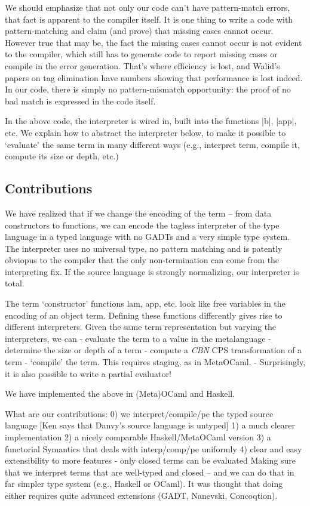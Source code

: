 \documentclass[preprint]{sigplanconf}
\begin{document}
We should emphasize that not only our code can't have pattern-match
errors, that fact is apparent to the compiler itself. It is one thing
to write a code with pattern-matching and claim (and prove) that
missing cases cannot occur. However true that may be, the fact the
missing cases cannot occur is not evident to the compiler, which still
has to generate code to report missing cases or compile in the error
generation. That's where efficiency is lost, and Walid's papers on tag
elimination have numbers showing that performance is lost indeed. 
In our code, there is simply no pattern-mismatch opportunity: the
proof of no bad match is expressed in the code itself. 


In the above code, the interpreter is wired in, built into the
functions |b|, |app|, etc. We explain how to abstract the interpreter
below, to make it possible to `evaluate' the same term in many different
ways (e.g., interpret term, compile it, compute its size or depth,
etc.)

\subsection{Contributions}

        We have realized that if we change the encoding of the term --
from data constructors to functions, we can encode the tagless
interpreter of the type language in a typed language with no GADTs and
a very simple type system. The interpreter uses no universal type, no
pattern matching and is patently obviopus to the compiler that the
only non-termination can come from the interpreting fix. If the source
language is strongly normalizing, our interpreter is total.


The term `constructor' functions lam, app, etc. look like free
variables in the encoding of an object term.  Defining these functions
differently gives rise to different interpreters.  Given the same term
representation but varying the interpreters, we can
	- evaluate the term to a value in the metalanguage
	- determine the size or depth of a term
        - compute a \emph{CBN} CPS transformation of a term
	- `compile' the term. This requires staging, as in MetaOCaml.
	- Surprisingly, it is also possible to write a partial
	evaluator! 

We have implemented the above in (Meta)OCaml and Haskell.

What are our contributions:
0) we interpret/compile/pe the typed source language
   [Ken says that Danvy's source language is untyped]
1) a much clearer implementation
2) a nicely comparable Haskell/MetaOCaml version
3) a functorial Symantics that deals with interp/comp/pe uniformly
4) clear and easy extensibility to more features
- only closed terms can be evaluated
Making sure that we interpret terms that are well-typed and closed --
and we can do that in far simpler type system (e.g., Haskell or
OCaml). It was thought that doing either requires quite advanced
extensions (GADT, Nanevski, Concoqtion).
\end{document}
